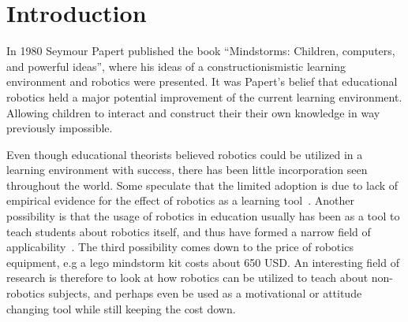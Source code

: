 \section*{Introduction}
In 1980 Seymour Papert published the book "`Mindstorms: Children, computers, and powerful ideas"'\cite{papert1980mindstorms}, where his ideas of a constructionismistic 
learning environment and robotics were presented. It was Papert's belief that educational robotics held a major potential improvement of the current learning environment.
Allowing children to interact and construct their their own knowledge in way previously impossible. 

\bigskip\noindent
Even though educational theorists believed robotics could be utilized in a learning environment with success, there has been little
incorporation seen throughout the world. 
Some speculate that the limited adoption is due to lack of empirical evidence for the effect of robotics as a learning tool~\cite{williams2007acquisition}.  
Another possibility is that the usage of robotics in education usually has been as a tool to teach students about robotics itself, 
and thus have formed a narrow field of applicability~\cite{rusk2008new}. 
The third possibility comes down to the price of robotics equipment, e.g a lego mindstorm kit costs about 650 USD. 
An interesting field of research is therefore to look at how robotics can be utilized to teach about non-robotics subjects, and perhaps even be used as a motivational or attitude changing tool while still keeping the cost down. 
